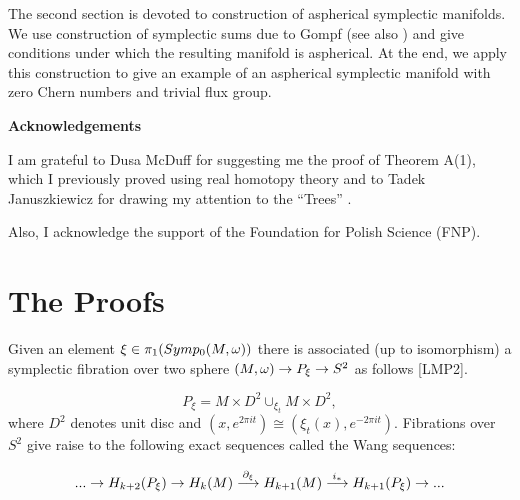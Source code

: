 \bigskip


The second section is devoted to construction of aspherical symplectic
manifolds. We use construction of symplectic sums due to Gompf 
\cite{gom} (see also \cite{mw}) and give conditions under which
the resulting manifold is aspherical. At the end, we apply this
construction to give an
example of an aspherical symplectic manifold with zero Chern
numbers and trivial flux group. 




\bigskip
\bigskip





{\bf Acknowledgements}

I am grateful to Dusa McDuff for suggesting me the proof
of Theorem A(1), which I previously proved using real
homotopy theory \cite{k} and to Tadek Januszkiewicz
for drawing my attention to the ``Trees'' \cite{se}.

Also, I acknowledge the support of the Foundation for Polish
Science (FNP).



\bigskip



























\bigskip

\section{The Proofs} \label{S:tp}
 
\bigskip

Given an element $\xi \in \pi _1(Symp_0(M,\omega)) $ there is associated
(up to isomorphism) a symplectic fibration over two sphere 
$(M,\omega) \to P_{\xi }\to S^2$ as follows [LMP2].


$$P_{\xi }=M\times D^2\cup _{\xi _t}M\times D^2,$$ 
where
$D^2$ denotes unit disc and 
$(x,e^{2\pi it})\cong(\xi _t(x),e^{-2\pi it})$.
Fibrations over $S^2$ give raise to the following exact
sequences called the Wang sequences:

$$
...\to H_{k+2}(P_{\xi})\to H_k(M)\stackrel{\partial _\xi }{\longrightarrow }
H_{k+1}(M)\stackrel{i_*}{\longrightarrow }H_{k+1}(P_{\xi})\to...
$$

